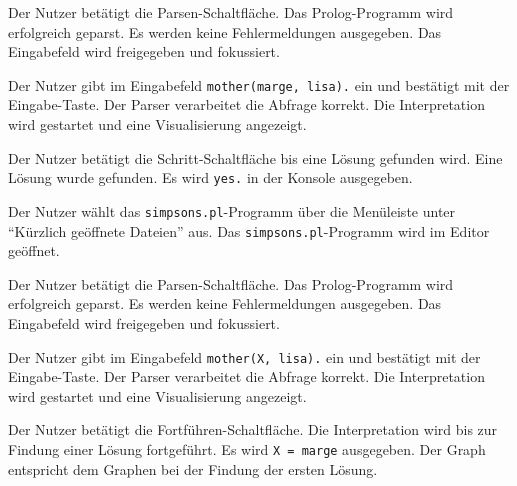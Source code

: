 \documentclass[parskip=full,11pt,twoside]{scrartcl}
\begin{document}
{Der Nutzer betätigt die Parsen-Schaltfläche.}
{Das Prolog-Programm wird erfolgreich geparst. Es werden keine Fehlermeldungen ausgegeben. Das Eingabefeld wird freigegeben und fokussiert.}

{Der Nutzer gibt im Eingabefeld \texttt{mother(marge, lisa).} ein und bestätigt mit der Eingabe-Taste.}
{Der Parser verarbeitet die Abfrage korrekt. Die Interpretation wird gestartet und eine Visualisierung angezeigt.}

{Der Nutzer betätigt die Schritt-Schaltfläche bis eine Lösung gefunden wird.}
{Eine Lösung wurde gefunden. Es wird \texttt{yes.} in der Konsole ausgegeben.}



{Der Nutzer wählt das \texttt{simpsons.pl}-Programm über die Menüleiste unter \enquote{Kürzlich geöffnete Dateien} aus.}
{Das \texttt{simpsons.pl}-Programm wird im Editor geöffnet.}

{Der Nutzer betätigt die Parsen-Schaltfläche.}
{Das Prolog-Programm wird erfolgreich geparst. Es werden keine Fehlermeldungen ausgegeben. Das Eingabefeld wird freigegeben und fokussiert.}

{Der Nutzer gibt im Eingabefeld \texttt{mother(X, lisa).} ein und bestätigt mit der Eingabe-Taste.}
{Der Parser verarbeitet die Abfrage korrekt. Die Interpretation wird gestartet und eine Visualisierung angezeigt.}

{Der Nutzer betätigt die Fortführen-Schaltfläche.}
{Die Interpretation wird bis zur Findung einer Lösung fortgeführt. Es wird \texttt{X = marge} ausgegeben. Der Graph entspricht dem Graphen bei der Findung der ersten Lösung.}
\end{document}
